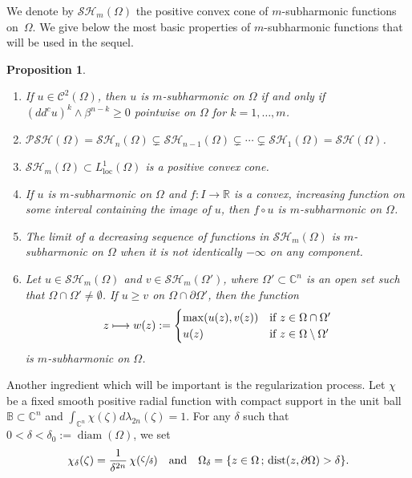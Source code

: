 \documentclass[JEP,XML,SOM,Unicode]{cedram}
\newcommand{\mto}{\mathchoice{\longmapsto}{\mapsto}{\mapsto}{\mapsto}}
\newcommand{\loc}{\mathrm{loc}}
\newcommand{\sep}{\,;\,}
\DeclareMathOperator{\dist}{dist}
\newtheorem{proposition}[theorem]{Proposition}
\theoremstyle{definition}
\newcommand{\B}{\mathbb{B}}
\newcommand{\R}{\mathbb{R}}
\renewcommand{\C}{\mathbb{C}}
\newcommand{\Cc}{\mathcal{C}}
\DeclareMathOperator{\diam}{diam}
\begin{document}
We denote by $\mathcal{SH}_m (\Omega) $ the positive convex cone of $m$-subharmonic functions on~$\Omega$. We give below the most basic properties of $m$-subharmonic functions that will be used in the sequel.

\skpt
\begin{proposition}\label{prop:basic}
\begin{enumerate}
\item
If $u\in \Cc^2(\Omega)$, then $u$ is $m$-subharmonic on $\Omega$ if and only if $(dd^c u)^k\wedge \beta^{n-k}\geq0$
pointwise on $\Omega$ for $k=1,\dots, m$.

\item
$\mathcal{PSH}(\Omega)=\mathcal{SH}_n(\Omega)\subsetneq \mathcal{SH}_{n-1}(\Omega)\subsetneq\cdots\subsetneq \mathcal{SH}_1(\Omega)=\mathcal{SH}(\Omega) $.

\item
$\mathcal{SH}_m(\Omega) \subset L^1_{\loc} (\Omega)$ is a positive convex cone.

\item
If $u$ is $m$-subharmonic on $\Omega$ and $f: I \to\R$ is a convex, increasing function on some interval containing the image of $u$, then $f\circ u$ is $m$-subharmonic on $\Omega$.

\item
The limit of a decreasing sequence of functions in $\mathcal{SH}_m(\Omega)$ is $m$-subharmonic on $\Omega$ when it is not identically $- \infty$ on any component.

\item
Let $u \in \mathcal{SH}_m(\Omega)$ and $v \in \mathcal{SH}_m(\Omega') $, where $\Omega'\subset\C^n$ is an open set such that $\Omega \cap \Omega' \neq \emptyset$. If $u\geq v$ on $\Omega \cap \partial\Omega'$, then the function
\[
z \mto w(z):=\begin{cases}
\max(u(z),v(z)) &\text{if } z \in \Omega \cap \Omega'\\
u(z) &\hbox{if } z \in\Omega\setminus\Omega'
\end{cases}
\]
is $m$-subharmonic on $\Omega$.
\end{enumerate}
\end{proposition}

Another ingredient which will be important is the regularization process. Let $\chi$ be a fixed smooth positive radial function with compact support in the unit ball $\B \subset \C^n$ and $\int_{\C^n}\chi (\zeta)d\lambda_{2 n}(\zeta)=1$.
For any $\delta$ such that $ 0 < \delta < \delta_0:= \diam (\Omega)$, we set
\[
\chi_{\delta}(\zeta)=\frac{1}{\delta^{2n}}\,\chi (\sfrac{\zeta}{\delta})\quad\text{and}\quad \Omega_{\delta}=\{z \in\Omega\sep \dist (z,\partial\Omega)>\delta\}.
\]
\end{document}
